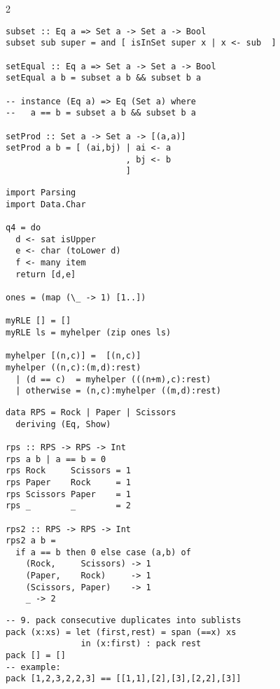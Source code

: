 \documentclass{article}
\def \columncount {2}
\begin{document}
\begin{multicols}{\columncount}
\begin{outline}[longenum]
\begin{verbatim}
subset :: Eq a => Set a -> Set a -> Bool
subset sub super = and [ isInSet super x | x <- sub  ]

setEqual :: Eq a => Set a -> Set a -> Bool
setEqual a b = subset a b && subset b a

-- instance (Eq a) => Eq (Set a) where
--   a == b = subset a b && subset b a

setProd :: Set a -> Set a -> [(a,a)]
setProd a b = [ (ai,bj) | ai <- a
                        , bj <- b
                        ]

\end{verbatim}


\begin{verbatim}
import Parsing
import Data.Char

q4 = do 
  d <- sat isUpper
  e <- char (toLower d)
  f <- many item
  return [d,e]

ones = (map (\_ -> 1) [1..])

myRLE [] = []
myRLE ls = myhelper (zip ones ls)

myhelper [(n,c)] =  [(n,c)] 
myhelper ((n,c):(m,d):rest)
  | (d == c)  = myhelper (((n+m),c):rest)
  | otherwise = (n,c):myhelper ((m,d):rest)
\end{verbatim}

\begin{verbatim}
data RPS = Rock | Paper | Scissors
  deriving (Eq, Show)

rps :: RPS -> RPS -> Int
rps a b | a == b = 0
rps Rock     Scissors = 1
rps Paper    Rock     = 1
rps Scissors Paper    = 1
rps _        _        = 2

rps2 :: RPS -> RPS -> Int
rps2 a b =
  if a == b then 0 else case (a,b) of
    (Rock,     Scissors) -> 1
    (Paper,    Rock)     -> 1
    (Scissors, Paper)    -> 1
    _ -> 2

\end{verbatim}

\begin{verbatim}
-- 9. pack consecutive duplicates into sublists
pack (x:xs) = let (first,rest) = span (==x) xs
               in (x:first) : pack rest
pack [] = []
-- example:
pack [1,2,3,2,2,3] == [[1,1],[2],[3],[2,2],[3]]
\end{verbatim}





\end{outline}
\end{multicols}
\end{document}
